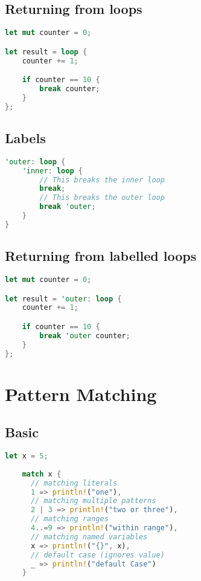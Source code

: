 \documentclass{article}
\begin{document}
\subsection{Returning from loops}

\begin{lstlisting}[language=Rust, style=boxed, numbers=none]
let mut counter = 0;

let result = loop {
    counter += 1;

    if counter == 10 {
        break counter;
    }
};
\end{lstlisting}

\subsection{Labels}

\begin{lstlisting}[language=Rust, style=boxed, numbers=none]
'outer: loop {
    'inner: loop {
        // This breaks the inner loop
        break;
        // This breaks the outer loop
        break 'outer;
    }
}
\end{lstlisting}

\subsection{Returning from labelled loops}

\begin{lstlisting}[language=Rust, style=boxed, numbers=none]
let mut counter = 0;

let result = 'outer: loop {
    counter += 1;

    if counter == 10 {
        break 'outer counter;
    }
};
\end{lstlisting}

\section{Pattern Matching}

\subsection{Basic}

\begin{lstlisting}[language=Rust, style=boxed, numbers=none]
    let x = 5;
    
    match x {
      // matching literals
      1 => println!("one"),
      // matching multiple patterns
      2 | 3 => println!("two or three"),
      // matching ranges
      4..=9 => println!("within range"),
      // matching named variables
      x => println!("{}", x),
      // default case (ignores value)
      _ => println!("default Case")
    }
\end{lstlisting}
\end{document}
